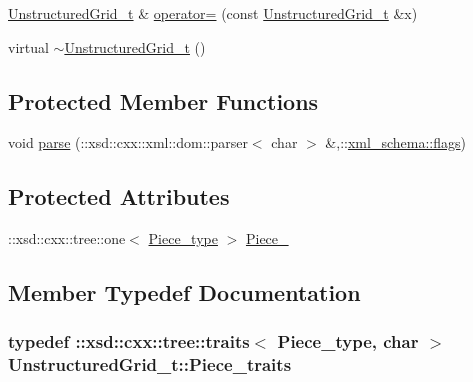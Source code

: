 \begin{DoxyCompactItemize}
\item 
\hyperlink{classUnstructuredGrid__t}{Unstructured\+Grid\+\_\+t} \& \hyperlink{classUnstructuredGrid__t_ac33ad0177719bcab9caa4fdf0efc51ae}{operator=} (const \hyperlink{classUnstructuredGrid__t}{Unstructured\+Grid\+\_\+t} \&x)
\item 
virtual \hyperlink{classUnstructuredGrid__t_a6fb9239ab1215edd7e7822a66d3af53c}{$\sim$\+Unstructured\+Grid\+\_\+t} ()
\end{DoxyCompactItemize}
\subsection*{Protected Member Functions}
\begin{DoxyCompactItemize}
\item 
void \hyperlink{classUnstructuredGrid__t_ae0663e380fcfcfd8b663a0a52241c034}{parse} (\+::xsd\+::cxx\+::xml\+::dom\+::parser$<$ char $>$ \&,\+::\hyperlink{namespacexml__schema_a0612287d030cb2732d31a45b258fdc87}{xml\+\_\+schema\+::flags})
\end{DoxyCompactItemize}
\subsection*{Protected Attributes}
\begin{DoxyCompactItemize}
\item 
\+::xsd\+::cxx\+::tree\+::one$<$ \hyperlink{classUnstructuredGrid__t_a559913611314b34f4868027fc91e35bc}{Piece\+\_\+type} $>$ \hyperlink{classUnstructuredGrid__t_aec675f4635fe96f8e4e5964e8220e0a0}{Piece\+\_\+}
\end{DoxyCompactItemize}


\subsection{Member Typedef Documentation}
\subsubsection[{\texorpdfstring{Piece\+\_\+traits}{Piece_traits}}]{\setlength{\rightskip}{0pt plus 5cm}typedef \+::xsd\+::cxx\+::tree\+::traits$<$ {\bf Piece\+\_\+type}, char $>$ {\bf Unstructured\+Grid\+\_\+t\+::\+Piece\+\_\+traits}}\hypertarget{classUnstructuredGrid__t_a8a9bf012c364a5fbb78aac9a319a4dad}{}\label{classUnstructuredGrid__t_a8a9bf012c364a5fbb78aac9a319a4dad}
